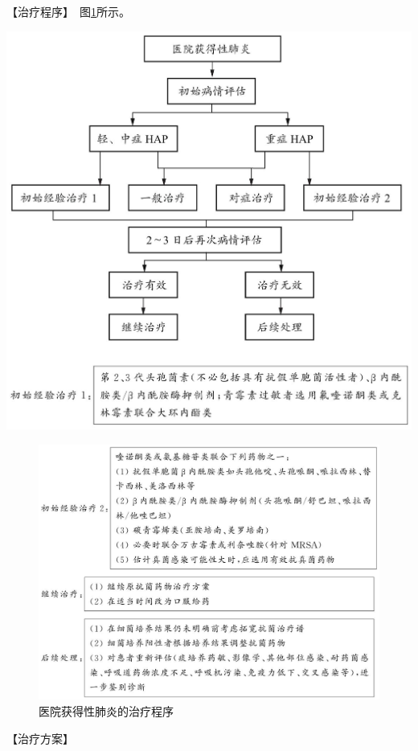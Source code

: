 【治疗程序】　图\ref{fig1-8-2}所示。

\includegraphics{./images/Image00017.jpg}
\begin{figure}[!htbp]
 \centering
 \includegraphics{./images/Image00018.jpg}
 \captionsetup{justification=centering}
 \caption{医院获得性肺炎的治疗程序}
 \label{fig1-8-2}
  \end{figure} 

【治疗方案】

